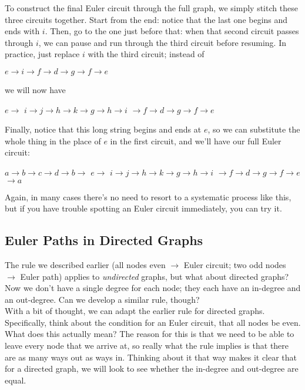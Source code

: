 To construct the final Euler circuit through the full graph, we simply stitch these three circuits together.  Start from the end: notice that the last one begins and ends with $i$.  Then, go to the one just before that: when that second circuit passes through $i$, we can pause and run through the third circuit before resuming.  In practice, just replace $i$ with the third circuit; instead of 
\begin{center}
{\color{green!50!black}$e \to i \to f \to d \to g \to f \to e$}
\end{center}
we will now have
\begin{center}
{\color{green!50!black}$e \to$} {\color{red!80!black}$i \to j \to h \to k \to g \to h \to i$} {\color{green!50!black}$\to f \to d \to g \to f \to e$}
\end{center}

Finally, notice that this long string begins and ends at $e$, so we can substitute the whole thing in the place of $e$ in the first circuit, and we'll have our full Euler circuit:
\begin{center}
{\color{blue!60!black}$a \to b \to c \to d \to b \to$} {\color{green!50!black}$e \to$} {\color{red!80!black}$i \to j \to h \to k \to g \to h \to i$} {\color{green!50!black}$\to f \to d \to g \to f \to e$} {\color{blue!60!black}$\to a$}
\end{center}

Again, in many cases there's no need to resort to a systematic process like this, but if you have trouble spotting an Euler circuit immediately, you can try it.

\subsection{Euler Paths in Directed Graphs}
The rule we described earlier (all nodes even $\to$ Euler circuit; two odd nodes $\to$ Euler path) applies to \emph{undirected} graphs, but what about directed graphs?  Now we don't have a single degree for each node; they each have an in-degree and an out-degree.  Can we develop a similar rule, though?\\

With a bit of thought, we can adapt the earlier rule for directed graphs.  Specifically, think about the condition for an Euler circuit, that all nodes be even.  What does this actually mean?  The reason for this is that we need to be able to leave every node that we arrive at, so really what the rule implies is that there are as many ways out as ways in.  Thinking about it that way makes it clear that for a directed graph, we will look to see whether the in-degree and out-degree are equal.\\

